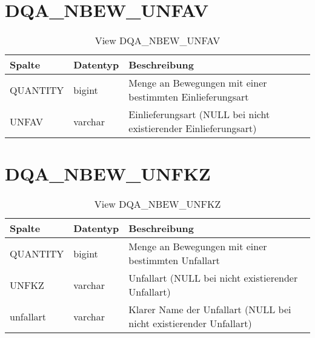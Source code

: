   \section{DQA\_NBEW\_UNFAV}

  \begin{table}[ht]
    \centering
    \caption{View DQA\_NBEW\_UNFAV}
    \label{tab:dqanbewunfav}
    \begin{tabular}{||l|l|p{10cm}||}
      \hline
      Spalte & Datentyp & Beschreibung \\ [0.5ex] \hline \hline
QUANTITY & bigint & Menge an Bewegungen mit einer bestimmten Einlieferungsart \\ \hline
UNFAV & varchar & Einlieferungsart (NULL bei nicht existierender Einlieferungsart)\\ \hline
    \end{tabular}
  \end{table}



  \section{DQA\_NBEW\_UNFKZ}

  \begin{table}[ht]
    \centering
    \caption{View DQA\_NBEW\_UNFKZ}
    \label{tab:dqanbewunfkz}
    \begin{tabular}{||l|l|p{10cm}||}
      \hline
      Spalte & Datentyp & Beschreibung \\ [0.5ex] \hline \hline
QUANTITY & bigint & Menge an Bewegungen mit einer bestimmten Unfallart \\ \hline
UNFKZ & varchar & Unfallart (NULL bei nicht existierender Unfallart)\\ \hline
unfallart & varchar & Klarer Name der Unfallart (NULL bei nicht existierender Unfallart)\\ \hline
    \end{tabular}
  \end{table}